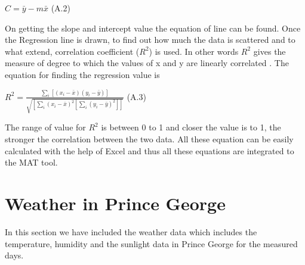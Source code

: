 \begin{center}
 
    { $ C = \bar{y}-m\bar{x}$}     \hspace{3cm}(A.2)

\end{center}


On getting the slope and intercept value the equation of line can be found. Once the Regression line is drawn, to find out how much the data is scattered and to what extend, correlation coefficient ($R^2$) is used. In other words $R^2$ gives the measure of  degree to which the values of x and y are linearly correlated \cite{Stone2001}. The equation for finding the regression value is

\begin{center}

    {\large $R^2 = \frac{\sum_i[(x_i-\bar x)(y_i-\bar y)]}{\sqrt{[\sum_i(x_i-\bar x)^2[\sum_i(y_i-\bar y)^2]]}}$ }  \hspace{2cm}(A.3)

\end{center}
The range of value for $R^2$ is between 0 to 1 and closer the value is to 1, the stronger the correlation between the two data.
All these equation can be easily calculated with the help of Excel and thus all these equations are integrated to the MAT tool.



\newpage

\section{Weather in Prince George}

In this section we have included the weather data which includes the temperature, humidity and the sunlight data in Prince George for the measured days.




